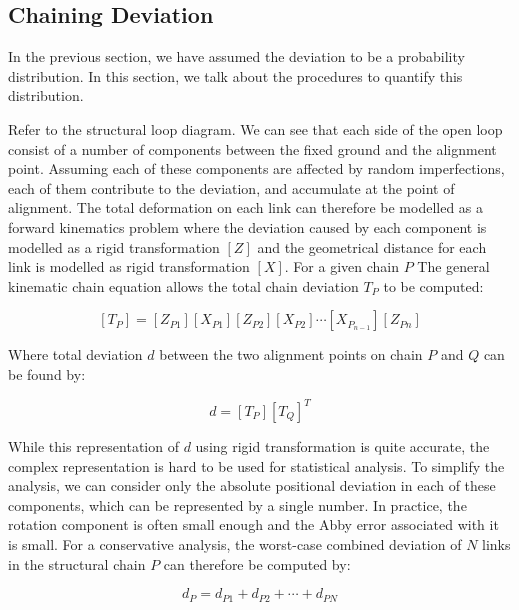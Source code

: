 \subsection{Chaining Deviation}
\label{subsection:new-hypo-model-chaining-deviation}

In the previous section, we have assumed the deviation to be a probability distribution. In this section, we talk about the procedures to quantify this distribution. 

Refer to the structural loop diagram. We can see that each side of the open loop consist of a number of components between the fixed ground and the alignment point. Assuming each of these components are affected by random imperfections, each of them contribute to the deviation, and accumulate at the point of alignment. The total deformation on each link can therefore be modelled as a forward kinematics problem where the deviation caused by each component is modelled as a rigid transformation $[Z]$ and the geometrical distance for each link is modelled as rigid transformation $[X]$. For a given chain $P$ The general kinematic chain equation allows the total chain deviation $T_P$ to be computed:

\begin{equation} \label{eq:one-chain-deviation}
    [T_P] = [Z_{P1}][X_{P1}][Z_{P2}][X_{P2}] \cdots [X_{P_{n-1}}][Z_{Pn}] 
\end{equation}

Where total deviation $d$ between the two alignment points on chain $P$ and $Q$ can be found by:

\begin{equation} \label{eq:two-chain-deviation}
    d = [T_P][T_Q]^T 
\end{equation}

While this representation of $d$ using rigid transformation is quite accurate, the complex representation is hard to be used for statistical analysis. To simplify the analysis, we can consider only the absolute positional deviation in each of these components, which can be represented by a single number. In practice, the rotation component is often small enough and the Abby error associated with it is small. For a conservative analysis, the worst-case combined deviation of $N$ links in the structural chain $P$ can therefore be computed by:

\begin{equation}
    d_P = d_{P1} + d_{P2} + \cdots + d_{PN}
\end{equation}

